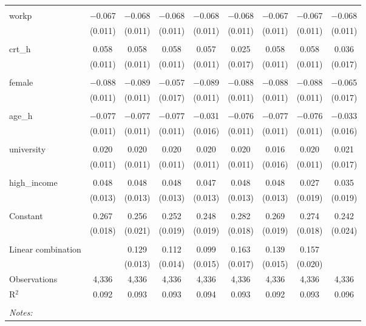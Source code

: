 \begin{table}[!htbp]
\begin{tabular}{@{\extracolsep{5pt}}lcccccccc}
  & & & & & & & & \\ 
 workp & $-$0.067 & $-$0.068 & $-$0.068 & $-$0.068 & $-$0.068 & $-$0.067 & $-$0.067 & $-$0.068 \\ 
  & (0.011) & (0.011) & (0.011) & (0.011) & (0.011) & (0.011) & (0.011) & (0.011) \\ 
  & & & & & & & & \\ 
 crt\_h & 0.058 & 0.058 & 0.058 & 0.057 & 0.025 & 0.058 & 0.058 & 0.036 \\ 
  & (0.011) & (0.011) & (0.011) & (0.011) & (0.017) & (0.011) & (0.011) & (0.017) \\ 
  & & & & & & & & \\ 
 female & $-$0.088 & $-$0.089 & $-$0.057 & $-$0.089 & $-$0.088 & $-$0.088 & $-$0.088 & $-$0.065 \\ 
  & (0.011) & (0.011) & (0.017) & (0.011) & (0.011) & (0.011) & (0.011) & (0.017) \\ 
  & & & & & & & & \\ 
 age\_h & $-$0.077 & $-$0.077 & $-$0.077 & $-$0.031 & $-$0.076 & $-$0.077 & $-$0.076 & $-$0.033 \\ 
  & (0.011) & (0.011) & (0.011) & (0.016) & (0.011) & (0.011) & (0.011) & (0.016) \\ 
  & & & & & & & & \\ 
 university & 0.020 & 0.020 & 0.020 & 0.020 & 0.020 & 0.016 & 0.020 & 0.021 \\ 
  & (0.011) & (0.011) & (0.011) & (0.011) & (0.011) & (0.016) & (0.011) & (0.017) \\ 
  & & & & & & & & \\ 
 high\_income & 0.048 & 0.048 & 0.048 & 0.047 & 0.048 & 0.048 & 0.027 & 0.035 \\ 
  & (0.013) & (0.013) & (0.013) & (0.013) & (0.013) & (0.013) & (0.019) & (0.019) \\ 
  & & & & & & & & \\ 
 Constant & 0.267 & 0.256 & 0.252 & 0.248 & 0.282 & 0.269 & 0.274 & 0.242 \\ 
  & (0.018) & (0.021) & (0.019) & (0.019) & (0.018) & (0.019) & (0.018) & (0.024) \\ 
  & & & & & & & & \\ 
Linear combination &   & 0.129 & 0.112 & 0.099 & 0.163 & 0.139 & 0.157 &  \\ 
 &  & (0.013) & (0.014) & (0.015) & (0.017) & (0.015) & (0.020) &  \\ 
Observations & 4,336 & 4,336 & 4,336 & 4,336 & 4,336 & 4,336 & 4,336 & 4,336 \\ 
R$^{2}$ & 0.092 & 0.093 & 0.093 & 0.094 & 0.093 & 0.092 & 0.093 & 0.096 \\ 
\hline \\[-1.8ex] 
\textit{Notes:} & \multicolumn{8}{l}{} \\ 
\end{tabular} 
\end{table} 
